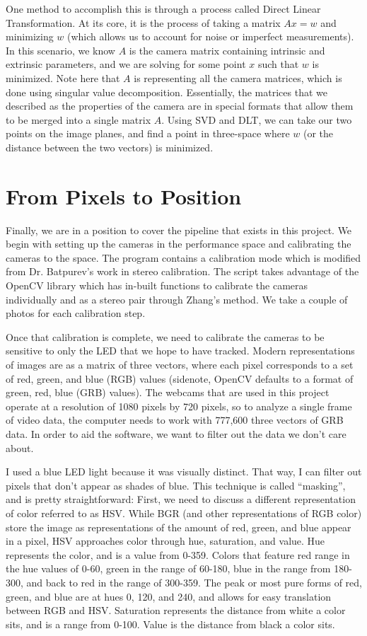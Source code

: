 \documentclass[12pt,twoside]{reedthesis}
\begin{document}
	One method to accomplish this is through a process called Direct Linear Transformation. At its core, it is the process of taking a matrix $Ax = w$ and minimizing $w$ (which allows us to account for noise or imperfect measurements). In this scenario, we know $A$ is the camera matrix containing intrinsic and extrinsic parameters, and we are solving for some point $x$ such that $w$ is minimized. Note here that $A$ is representing all the camera matrices, which is done using singular value decomposition. Essentially, the matrices that we described as the properties of the camera are in special formats that allow them to be merged into a single matrix $A$. Using SVD and DLT, we can take our two points on the image planes, and find a point in three-space where $w$ (or the distance between the two vectors) is minimized.

\section{From Pixels to Position}
Finally, we are in a position to cover the pipeline that exists in this project. We begin with setting up the cameras in the performance space and calibrating the cameras to the space. The program contains a calibration mode which is modified from Dr. Batpurev's work in stereo calibration. The script takes advantage of the OpenCV library which has in-built functions to calibrate the cameras individually and as a stereo pair through Zhang's method. We take a couple of photos for each calibration step.

Once that calibration is complete, we need to calibrate the cameras to be sensitive to only the LED that we hope to have tracked. Modern representations of images are as a matrix of three vectors, where each pixel corresponds to a set of red, green, and blue (RGB) values (sidenote, OpenCV defaults to a format of green, red, blue (GRB) values). The webcams that are used in this project operate at a resolution of 1080 pixels by 720 pixels, so to analyze a single frame of video data, the computer needs to work with 777,600 three vectors of GRB data. In order to aid the software, we want to filter out the data we don't care about.

I used a blue LED light because it was visually distinct. That way, I can filter out pixels that don't appear as shades of blue. This technique is called “masking”, and is pretty straightforward: First, we need to discuss a different representation of color referred to as HSV. While BGR (and other representations of RGB color) store the image as representations of the amount of red, green, and blue appear in a pixel, HSV approaches color through hue, saturation, and value. Hue represents the color, and is a value from 0-359. Colors that feature red range in the hue values of 0-60, green in the range of 60-180, blue in the range from 180-300, and back to red in the range of 300-359. The peak or most pure forms of red, green, and blue are at hues 0, 120, and 240, and allows for easy translation between RGB and HSV. Saturation represents the distance from white a color sits, and is a range from 0-100. Value is the distance from black a color sits.
\end{document}
